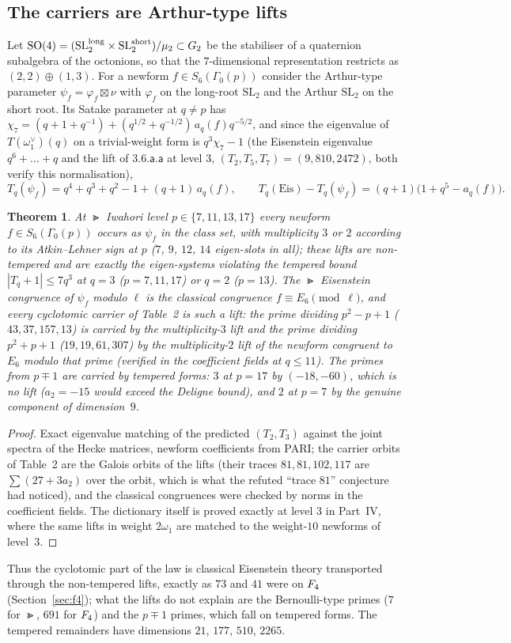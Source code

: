 \documentclass[11pt]{amsart}
\newtheorem{theorem}{Theorem}[section]
\theoremstyle{definition}
\begin{document}
\subsection{The carriers are Arthur-type lifts}\label{sec:carriers-lifts}
Let $\mathrm{SO}(4)=(\mathrm{SL}_2^{\rm long}\times\mathrm{SL}_2^{\rm short})/\mu_2\subset G_2$ be the stabiliser of a quaternion subalgebra of the octonions, so that the $7$-dimensional representation restricts as $(2,2)\oplus(1,3)$. For a newform $f\in S_6(\Gamma_0(p))$ consider the Arthur-type parameter $\psi_f=\varphi_f\boxtimes\nu$ with $\varphi_f$ on the long-root $\mathrm{SL}_2$ and the Arthur $\mathrm{SL}_2$ on the short root. Its Satake parameter at $q\ne p$ has $\chi_7=(q+1+q^{-1})+(q^{1/2}+q^{-1/2})\,a_q(f)q^{-5/2}$, and since the eigenvalue of $T(\omega_1^\vee)(q)$ on a trivial-weight form is $q^3\chi_7-1$ (the Eisenstein eigenvalue $q^6+\dots+q$ and the lift of $\mathsf{3.6.a.a}$ at level $3$, $(T_2,T_5,T_7)=(9,810,2472)$, both verify this normalisation),
\[T_q(\psi_f)=q^4+q^3+q^2-1+(q+1)\,a_q(f),\qquad T_q(\mathrm{Eis})-T_q(\psi_f)=(q+1)\big(1+q^5-a_q(f)\big).\]
\begin{theorem}\label{thm:carriers}
At $\Gt$ Iwahori level $p\in\{7,11,13,17\}$ every newform $f\in S_6(\Gamma_0(p))$ occurs as $\psi_f$ in the class set, with multiplicity $3$ or $2$ according to its Atkin--Lehner sign at $p$ ($7$, $9$, $12$, $14$ eigen-slots in all); these lifts are non-tempered and are exactly the eigen-systems violating the tempered bound $|T_q+1|\le 7q^3$ at $q=3$ ($p=7,11,17$) or $q=2$ ($p=13$). The $\Gt$ Eisenstein congruence of $\psi_f$ modulo $\ell$ is the classical congruence $f\equiv E_6\pmod\ell$, and every cyclotomic carrier of Table~2 is such a lift: the prime dividing $p^2-p+1$ ($43,37,157,13$) is carried by the multiplicity-$3$ lift and the prime dividing $p^2+p+1$ ($19,19,61,307$) by the multiplicity-$2$ lift of the newform congruent to $E_6$ modulo that prime (verified in the coefficient fields at $q\le 11$). The primes from $p\mp1$ are carried by tempered forms: $3$ at $p=17$ by $(-18,-60)$, which is no lift ($a_2=-15$ would exceed the Deligne bound), and $2$ at $p=7$ by the genuine component of dimension~$9$.
\end{theorem}
\begin{proof}
Exact eigenvalue matching of the predicted $(T_2,T_3)$ against the joint spectra of the Hecke matrices, newform coefficients from PARI; the carrier orbits of Table~2 are the Galois orbits of the lifts (their traces $81,81,102,117$ are $\sum(27+3a_2)$ over the orbit, which is what the refuted ``trace $81$'' conjecture had noticed), and the classical congruences were checked by norms in the coefficient fields. The dictionary itself is proved exactly at level $3$ in Part~IV, where the same lifts in weight $2\omega_1$ are matched to the weight-$10$ newforms of level~$3$.
\end{proof}
Thus the cyclotomic part of the law is classical Eisenstein theory transported through the non-tempered lifts, exactly as $73$ and $41$ were on $F_4$ (Section~\ref{sec:f4}); what the lifts do not explain are the Bernoulli-type primes ($7$ for $\Gt$, $691$ for $F_4$) and the $p\mp1$ primes, which fall on tempered forms. The tempered remainders have dimensions $21$, $177$, $510$, $2265$.
\end{document}

